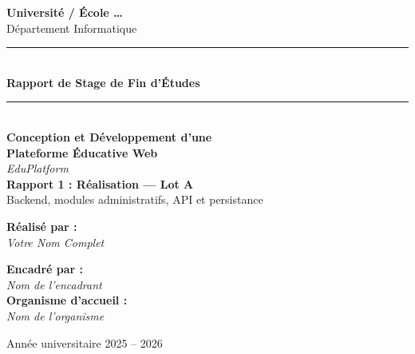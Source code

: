 \begin{titlepage}
\begin{center}


\vspace*{1cm}

{\large \textbf{Université / École …}}\\[0.3cm]
{\large Département Informatique}\\[1.5cm]

\rule{\textwidth}{1.5pt}\\[0.4cm]
{\Huge \bfseries \color{NavyBlue} Rapport de Stage de Fin d'Études}\\[0.3cm]
\rule{\textwidth}{1.5pt}\\[1.5cm]

{\LARGE \bfseries Conception et Développement d'une\\[0.3cm]
Plateforme Éducative Web}\\[0.3cm]
{\Large \textit{EduPlatform}}\\[2cm]

{\large \bfseries Rapport 1 : Réalisation — Lot A}\\[0.2cm]
{\normalsize Backend, modules administratifs, API et persistance}\\[1.2cm]

\begin{minipage}[t]{0.45\textwidth}
\begin{flushleft}
\textbf{Réalisé par :}\\
\textit{Votre Nom Complet}
\end{flushleft}
\end{minipage}
\hfill
\begin{minipage}[t]{0.45\textwidth}
\begin{flushright}
\textbf{Encadré par :}\\
\textit{Nom de l'encadrant}\\[0.5cm]
\textbf{Organisme d'accueil :}\\
\textit{Nom de l'organisme}
\end{flushright}
\end{minipage}

\vfill

{\large Année universitaire 2025 -- 2026}

\end{center}
\end{titlepage}

